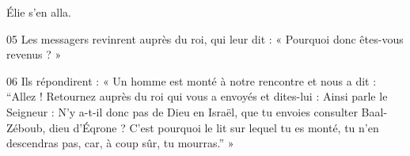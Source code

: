 Élie s’en alla.

05 Les messagers revinrent auprès du roi, qui leur dit : « Pourquoi donc êtes-vous revenus ? »

06 Ils répondirent : « Un homme est monté à notre rencontre et nous a dit : “Allez ! Retournez auprès du roi qui vous a envoyés et dites-lui : Ainsi parle le Seigneur : N’y a-t-il donc pas de Dieu en Israël, que tu envoies consulter Baal-Zéboub, dieu d’Éqrone ? C’est pourquoi le lit sur lequel tu es monté, tu n’en descendras pas, car, à coup sûr, tu mourras.” »
